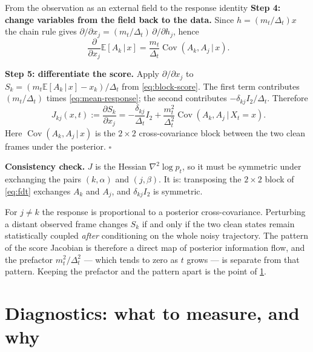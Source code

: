 \documentclass[11pt,a4paper]{article}
\newcommand{\E}{\mathbb{E}}
\newcommand{\given}{\,\vert\,}
\newcommand{\mt}{m_t}
\newcommand{\Dt}{\Delta_t}
\newcommand{\Cov}{\operatorname{Cov}}
\newcounter{toolbox}
\begin{document}
\begin{toolbox}{From the observation as an external field to the response identity}
\textbf{Step 4: change variables from the field back to the data.} Since $h=(\mt/\Dt)x$ the
chain rule gives $\partial/\partial x_j=(\mt/\Dt)\,\partial/\partial h_j$, hence
\begin{equation}
 \boxed{\;\frac{\partial}{\partial x_j}\E[A_k\given x]
 =\frac{\mt}{\Dt}\Cov(A_k,A_j\given x).}
 \label{eq:mean-response}
\end{equation}

\textbf{Step 5: differentiate the score.} Apply
$\partial/\partial x_j$ to $S_k=(\mt\E[A_k\given x]-x_k)/\Dt$ from \eqref{eq:block-score}. The
first term contributes $(\mt/\Dt)$ times \eqref{eq:mean-response}; the second contributes
$-\delta_{kj}I_2/\Dt$. Therefore
\begin{equation}
 \boxed{\;J_{kj}(x,t):=\frac{\partial S_k}{\partial x_j}
 =-\frac{\delta_{kj}}{\Dt}I_2
 +\frac{\mt^2}{\Dt^2}\Cov(A_k,A_j\given X_t=x).}
 \label{eq:fdt}
\end{equation}
Here $\Cov(A_k,A_j\given x)$ is the $2\times2$ cross-covariance block between the two clean
frames under the posterior. \hfill$\square$

\textbf{Consistency check.} $J$ is the Hessian $\nabla^2\log p_t$, so it must be symmetric
under exchanging the pairs $(k,\alpha)$ and $(j,\beta)$. It is: transposing the $2\times2$
block of \eqref{eq:fdt} exchanges $A_k$ and $A_j$, and $\delta_{kj}I_2$ is symmetric.
\end{toolbox}

\begin{intuition}
For $j\ne k$ the response is proportional to a posterior cross-covariance. Perturbing a
distant observed frame changes $S_k$ if and only if the two clean states remain statistically
coupled \emph{after} conditioning on the whole noisy trajectory. The pattern of the score
Jacobian is therefore a direct map of posterior information flow, and the prefactor
$\mt^2/\Dt^2$ --- which tends to zero as $t$ grows --- is separate from that pattern. Keeping
the prefactor and the pattern apart is the point of \cref{sec:diagnostics}.
\end{intuition}

\section{Diagnostics: what to measure, and why}\label{sec:diagnostics}
\end{document}
